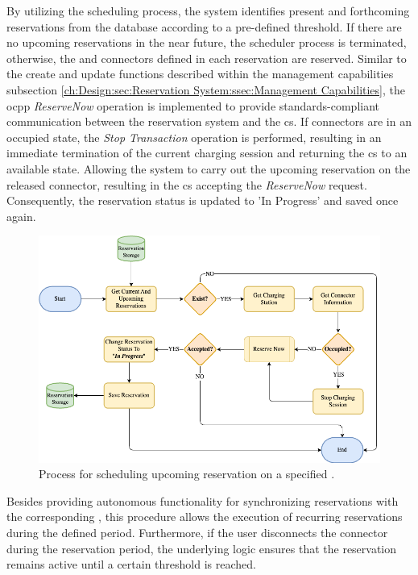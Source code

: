By utilizing the scheduling process, the system identifies present and forthcoming reservations from the database according to a pre-defined threshold. 
If there are no upcoming reservations in the near future, the scheduler process is terminated, otherwise, the  and connectors defined in each reservation are reserved.
Similar to the create and update functions described within the management capabilities subsection \ref{ch:Design:sec:Reservation System:ssec:Management Capabilities}, the \acrshort{ocpp} \textit{ReserveNow} operation \cite{noauthor_ocpp_nodate} is implemented to provide standards-compliant communication between the reservation system and the \acrshort{cs}.
If connectors are in an occupied state, the \textit{Stop Transaction} operation is performed, resulting in an immediate termination of the current charging session and returning the \acrshort{cs} to an available state.
Allowing the system to carry out the upcoming reservation on the released connector, resulting in the \acrshort{cs} accepting the \textit{ReserveNow} request.
Consequently, the reservation status is updated to 'In Progress' and saved once again.

\begin{figure}[h]
    \centering
    \includegraphics[scale=0.4]{resources/images/main/5_design/processes/scheduler/SynchronizeReservation.png}
    \caption{Process for scheduling upcoming reservation on a specified .}
    \label{fig:schedule-reservation-flowchart}
\end{figure}

\noindent Besides providing autonomous functionality for synchronizing reservations with the corresponding , this procedure allows the execution of recurring reservations during the defined period. 
Furthermore, if the user disconnects the connector during the reservation period, the underlying logic ensures that the reservation remains active until a certain threshold is reached.

